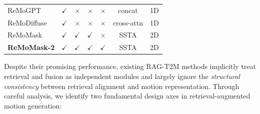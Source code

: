 \documentclass[10pt,journal,compsoc]{IEEEtran}
\begin{document}
\begin{table}[t]
{\begin{tabular}{l | c | c | c | c | c | c }
        ReMoGPT~\cite{remogpt} & $\checkmark$  & $\times$  & $\times$ & $\times$ & concat & 1D  \\

        ReMoDiffuse~\cite{remodiffuse} & $\checkmark$  & $\times$  & $\times$ & $\times$ & cross-attn & 1D  \\

        \midrule
        ReMoMask &  $\checkmark$   & $\checkmark$  & $\checkmark$ & $\times$ & SSTA & 2D  \\
        \rowcolor{yellow!20}\textbf{ReMoMask-2} &  $\checkmark$   & $\checkmark$  & $\checkmark$ & $\checkmark$ & SSTA & 2D  \\
        \bottomrule
    \end{tabular}
}

\label{tab:delta}
\end{table}

Despite their promising performance, existing RAG-T2M methods implicitly treat retrieval and fusion as independent modules and largely ignore the \emph{structural consistency} between retrieval alignment and motion representation. Through careful analysis, we identify two fundamental design axes in retrieval-augmented motion generation:



        
        


\end{document}
